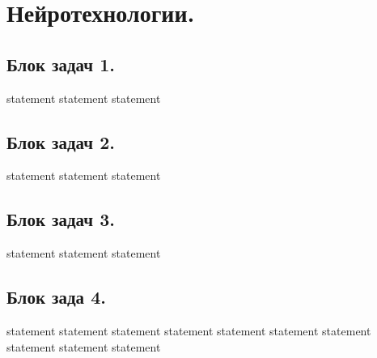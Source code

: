 \chapter{Нейротехнологии.}

\section{Блок задач 1.}

{statement}
{statement}
{statement}

\section{Блок задач 2.}

{statement}
{statement}
{statement}

\section{Блок задач 3.}

{statement}
{statement}
{statement}

\section{Блок зада 4.}

{statement}
{statement}
{statement}
{statement}
{statement}
{statement}
{statement}
{statement}
{statement}
{statement}
